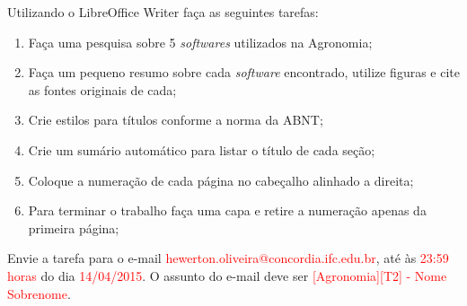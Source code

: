 \documentclass[task]{IFCExams}
\author{Prof. Me. Hewerton Enes de Oliveira}
\begin{document}
 
 \noindent
 Utilizando o LibreOffice Writer faça as seguintes tarefas:
 \begin{enumerate}
  \item Faça uma pesquisa sobre 5 \emph{softwares} utilizados na Agronomia;
  \item Faça um pequeno resumo sobre cada \emph{software} encontrado, utilize figuras e cite as fontes originais de cada;
  \item Crie estilos para títulos conforme a norma da ABNT;
  \item Crie um sumário automático para listar o título de cada seção;
  \item Coloque a numeração de cada página no cabeçalho alinhado a direita;
  \item Para terminar o trabalho faça uma capa e retire a numeração apenas da 
primeira página;
  
 \end{enumerate}
 
 
 \large{
 \noindent
  Envie a tarefa para o e-mail 
  \textcolor{red}{hewerton.oliveira@concordia.ifc.edu.br}, até às
  \textcolor{red}{23:59 horas} do dia \textcolor{red}{14/04/2015}.
  O assunto do e-mail deve ser \textcolor{red}{[Agronomia][T2] - Nome 
  Sobrenome}. 
 }

 
\end{document}
